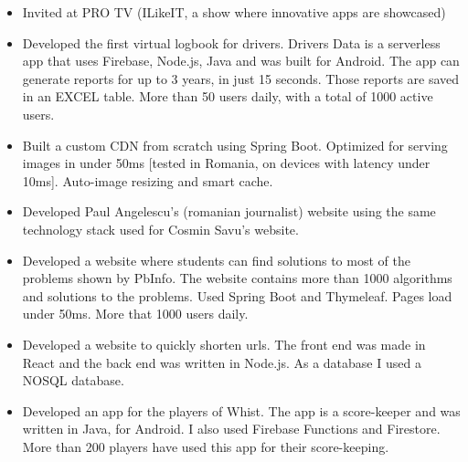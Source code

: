 \begin{itemize}
    \item Invited at PRO TV (ILikeIT, a show where innovative apps are showcased)
\end{itemize}

\begin{itemize}
    \item Developed the first virtual logbook for drivers. Drivers Data is a serverless app that uses Firebase, Node.js, Java and was built for Android. The app can generate reports for up to 3 years, in just 15 seconds. Those reports are saved in an EXCEL table. More than 50 users daily, with a total of 1000 active users.
\end{itemize}
\begin{itemize}
    \item Built a custom CDN from scratch using Spring Boot. Optimized for serving images in under 50ms [tested in Romania, on devices with latency under 10ms]. Auto-image resizing and smart cache.
\end{itemize}
\begin{itemize}
    \item Developed Paul Angelescu's (romanian journalist) website using the same technology stack used for Cosmin Savu's website.
\end{itemize}
\begin{itemize}
    \item Developed a website where students can find solutions to most of the problems shown by PbInfo. The website contains more than 1000 algorithms and solutions to the problems. Used Spring Boot and Thymeleaf. Pages load under 50ms. More that 1000 users daily.
\end{itemize}
\begin{itemize}
    \item Developed a website to quickly shorten urls. The front end was made in React and the back end was written in Node.js. As a database I used a NOSQL database.
\end{itemize}
\begin{itemize}
    \item Developed an app for the players of Whist. The app is a score-keeper and was written in Java, for Android. I also used Firebase Functions and Firestore. More than 200 players have used this app for their score-keeping.
\end{itemize}
